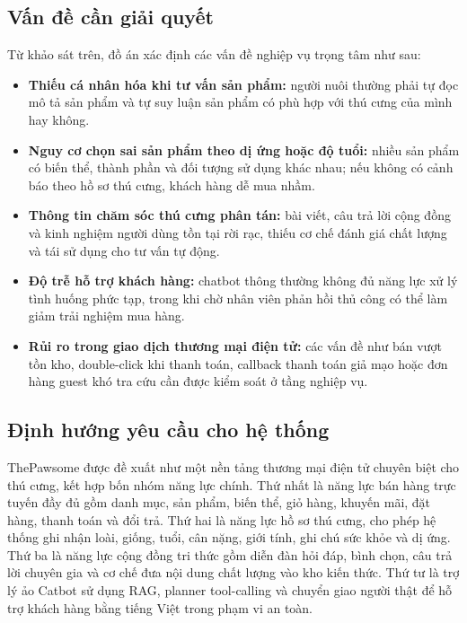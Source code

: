 \documentclass[../DoAn.tex]{subfiles}
\begin{document}
\subsection{Vấn đề cần giải quyết}
\label{subsection:2.1.3}

Từ khảo sát trên, đồ án xác định các vấn đề nghiệp vụ trọng tâm như sau:

\begin{itemize}[leftmargin=*]
    \item \textbf{Thiếu cá nhân hóa khi tư vấn sản phẩm:} người nuôi thường phải tự đọc mô tả sản phẩm và tự suy luận sản phẩm có phù hợp với thú cưng của mình hay không.
    \item \textbf{Nguy cơ chọn sai sản phẩm theo dị ứng hoặc độ tuổi:} nhiều sản phẩm có biến thể, thành phần và đối tượng sử dụng khác nhau; nếu không có cảnh báo theo hồ sơ thú cưng, khách hàng dễ mua nhầm.
    \item \textbf{Thông tin chăm sóc thú cưng phân tán:} bài viết, câu trả lời cộng đồng và kinh nghiệm người dùng tồn tại rời rạc, thiếu cơ chế đánh giá chất lượng và tái sử dụng cho tư vấn tự động.
    \item \textbf{Độ trễ hỗ trợ khách hàng:} chatbot thông thường không đủ năng lực xử lý tình huống phức tạp, trong khi chờ nhân viên phản hồi thủ công có thể làm giảm trải nghiệm mua hàng.
    \item \textbf{Rủi ro trong giao dịch thương mại điện tử:} các vấn đề như bán vượt tồn kho, double-click khi thanh toán, callback thanh toán giả mạo hoặc đơn hàng guest khó tra cứu cần được kiểm soát ở tầng nghiệp vụ.
\end{itemize}

\subsection{Định hướng yêu cầu cho hệ thống}
\label{subsection:2.1.4}

ThePawsome được đề xuất như một nền tảng thương mại điện tử chuyên biệt cho thú cưng, kết hợp bốn nhóm năng lực chính. Thứ nhất là năng lực bán hàng trực tuyến đầy đủ gồm danh mục, sản phẩm, biến thể, giỏ hàng, khuyến mãi, đặt hàng, thanh toán và đổi trả. Thứ hai là năng lực hồ sơ thú cưng, cho phép hệ thống ghi nhận loài, giống, tuổi, cân nặng, giới tính, ghi chú sức khỏe và dị ứng. Thứ ba là năng lực cộng đồng tri thức gồm diễn đàn hỏi đáp, bình chọn, câu trả lời chuyên gia và cơ chế đưa nội dung chất lượng vào kho kiến thức. Thứ tư là trợ lý ảo Catbot sử dụng RAG, planner tool-calling và chuyển giao người thật để hỗ trợ khách hàng bằng tiếng Việt trong phạm vi an toàn.
\end{document}
